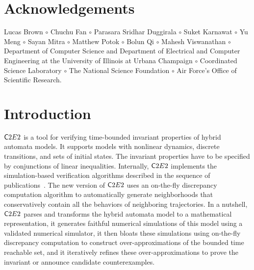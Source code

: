 \documentclass{tufte-book} %
\begin{document}

\tableofcontents %





\mainmatter

\chapter{Acknowledgements}
\label{sec:ack}
Lucas Brown $\circ$
Chuchu Fan $\circ$
Parasara Sridhar Duggirala $\circ$
Suket Karnawat $\circ$
Yu Meng $\circ$
Sayan Mitra $\circ$
Matthew Potok $\circ$
Bolun Qi $\circ$
Mahesh Viswanathan $\circ$
Department of Computer Science and Department of Electrical and Computer Engineering at the University of Illinois at Urbana Champaign $\circ$
Coordinated Science Laboratory $\circ$
The National Science Foundation $\circ$ 
Air Force's Office of Scientific Research.



\chapter{Introduction}
\label{sec:intro}
${{\mathsf C2E2}}$ is a tool for verifying time-bounded invariant properties of hybrid automata models. It supports models with nonlinear dynamics, discrete transitions, and sets of initial states. The invariant properties have to be specified by conjunctions of linear inequalities. Internally, ${{\mathsf C2E2}}$ implements the simulation-based verification algorithms described in the sequence of publications~\citet{fan2016automatic,ChuchuATVA,DMV13,DuggiralaWMVM14,SM:HSCC2011}. The new version of ${{\mathsf C2E2}}$ uses an on-the-fly discrepancy computation algorithm \citet{ChuchuATVA} to automatically generate neighborhoods that conservatively contain all the behaviors of neighboring trajectories. In a nutshell, ${{\mathsf C2E2}}$ parses and transforms the hybrid automata model to a mathematical representation, it generates faithful numerical simulations of this model using a validated numerical simulator, it then bloats these simulations using on-the-fly discrepancy computation to construct over-approximations of the bounded time reachable set, and it iteratively refines these over-approximations to prove the invariant or announce candidate counterexamples.
\end{document}
